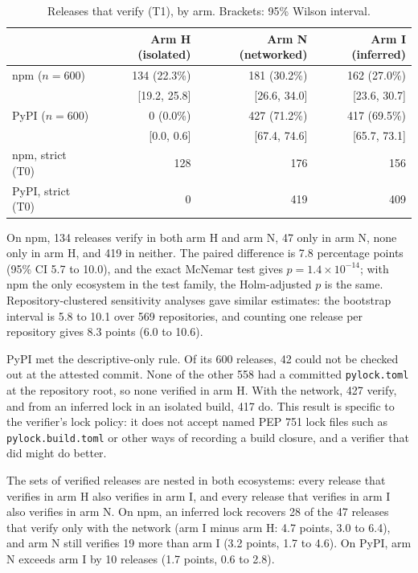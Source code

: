\documentclass[11pt]{article}
\begin{document}
\begin{table}[htbp]
\centering
\caption{Releases that verify (T1), by arm. Brackets: 95\% Wilson
interval.}
\label{tab:rates}
\begin{tabular}{lrrr}
\toprule
& Arm H (isolated) & Arm N (networked) & Arm I (inferred) \\
\midrule
npm ($n=600$) & 134 (22.3\%) & 181 (30.2\%) & 162 (27.0\%) \\
& [19.2, 25.8] & [26.6, 34.0] & [23.6, 30.7] \\
PyPI ($n=600$) & 0 (0.0\%) & 427 (71.2\%) & 417 (69.5\%) \\
& [0.0, 0.6] & [67.4, 74.6] & [65.7, 73.1] \\
\midrule
npm, strict (T0) & 128 & 176 & 156 \\
PyPI, strict (T0) & 0 & 419 & 409 \\
\bottomrule
\end{tabular}
\end{table}

On npm, 134 releases verify in
both arm H and arm N, 47 only in arm N, none only in arm H, and 419 in
neither. The paired difference is 7.8 percentage points (95\% CI 5.7 to
10.0), and the exact McNemar test gives $p = 1.4\times10^{-14}$; with npm
the only ecosystem in the test family, the Holm-adjusted $p$ is the same.
Repository-clustered sensitivity analyses gave similar estimates: the
bootstrap interval is 5.8 to 10.1 over 569 repositories, and counting one
release per repository gives 8.3 points (6.0 to 10.6).

PyPI met the descriptive-only rule. Of its 600 releases, 42 could not be
checked out at the attested commit. None of the other 558 had a committed
\texttt{pylock.toml} at the repository root, so none verified in arm H.
With the network, 427 verify, and from an inferred lock in an isolated
build, 417 do. This result is specific to the verifier's lock policy: it
does not accept named PEP 751 lock files such as
\texttt{pylock.build.toml} or other ways of recording a build closure,
and a verifier that did might do better.

The sets of verified releases are nested in both ecosystems: every
release that verifies in arm H also verifies in arm I, and every release
that verifies in arm I also verifies in arm N. On npm, an inferred lock
recovers 28 of the 47 releases that verify only with the network (arm I
minus arm H: 4.7 points, 3.0 to 6.4), and arm N still verifies 19 more
than arm I (3.2 points, 1.7 to 4.6). On PyPI, arm N exceeds arm I by 10
releases (1.7 points, 0.6 to 2.8).
\end{document}

